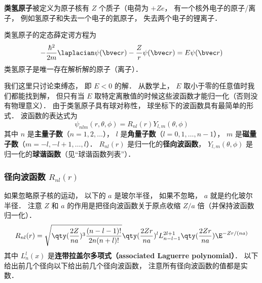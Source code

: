 

\textbf{类氢原子}被定义为原子核有 $Z$ 个质子（电荷为 $+Ze$， 有一个核外电子的原子/离子， 例如氢原子和失去一个电子的氦原子， 失去两个电子的锂离子． %

类氢原子的定态薛定谔方程为
\begin{equation}\label{HWF_eq1}
-\frac{\hbar^2}{2m} \laplacian \psi(\bvec r) - \frac{Z}{r} \psi(\bvec r) = E \psi(\bvec r)
\end{equation}
类氢原子是唯一存在解析解的原子（离子）．

我们这里只讨论束缚态， 即 $E < 0$ 的解．  从数学上， $E$ 取小于零的任意值时我们都能找到解， 但只有当 $E$ 取特定离散值的时候这些波函数才能归一化（否则没有物理意义）． 由于类氢原子具有球对称性， 球坐标下的波函数具有最简单的形式． 波函数的表达式为
\begin{equation}\label{HWF_eq3}
\psi_{nlm} (r,\theta ,\phi) = R_{nl}(r) Y_{l,m}(\theta, \phi)
\end{equation}
其中 $n$ 是\textbf{主量子数}（$n = 1, 2, \dots$）， $l$ 是\textbf{角量子数}（$l = 0, 1, \dots, n - 1$）， $m$ 是\textbf{磁量子数}（$m = -l, -l+1, \dots, l$）． $R_{nl}(r)$ 是归一化的\textbf{径向波函数}， $Y_{l,m}(\theta, \phi)$ 是归一化的\textbf{球谐函数}（见“球谐函数列表”）．

\subsubsection{径向波函数 $R_{nl}(r)$}

如果忽略原子核的运动， 以下的 $a$ 是玻尔半径， 如果不忽略， $a$ 就是约化玻尔半径．%
注意 $Z$ 和 $a$ 的作用是把径向波函数关于原点收缩 $Z/a$ 倍（并保持波函数归一化）．
\begin{equation}\label{HWF_eq2}
R_{nl}(r) = \sqrt{\qty(\frac{2 Z}{na})^3 \frac{(n - l - 1)!}{2n (n + l)!}} \qty(\frac{2Zr}{na})^l  L_{n-l-1}^{2l+1}\qty(\frac{2Zr}{na}) \E^{-Zr/(na)}
\end{equation}
其中 $L_n^l(x)$ 是\textbf{连带拉盖尔多项式（associated Laguerre polynomial）}． 以下给出前几个径向以下给出前几个径向波函数， 注意所有径向波函数的值都是实数．

